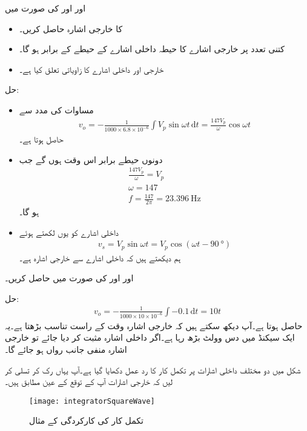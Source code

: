  اور  اور  کی صورت میں
\begin{itemize}
\item
   کا خارجی اشارہ حاصل کریں۔
\item
کتنی تعدد پر خارجی اشارے کا حیطہ داخلی اشارے کے حیطے  کے برابر ہو گا۔
\item
خارجی اور داخلی اشارے کا زاویاتی تعلق کیا ہے۔
\end{itemize}
حل:
\begin{itemize}
\item
مساوات  کی مدد سے
\begin{align*}
v_o=-\frac{1}{1000 \times 6.8 \times 10^{-6}} \int V_p \sin \omega t \, \mathrm{d} t=\frac{147 V_p}{\omega} \cos \omega t
\end{align*}
حاصل ہوتا ہے۔
\item
دونوں حیطے برابر اس وقت ہوں گے جب
\begin{align*}
\frac{147 V_p}{\omega}=V_p\\
\omega = 147\\
f=\frac{147}{2 \pi} =\SI{23.396}{\hertz}
\end{align*}
ہو گا۔
\item
داخلی اشارے کو یوں لکھتے ہوئے
\begin{align*}
v_s=V_p \sin \omega t= V_p \cos \left(\omega t-\SI{90}{\degree}\right)
\end{align*}
ہم دیکھتے ہیں کہ داخلی اشارے سے خارجی اشارہ   ہے۔
\end{itemize}
 اور  اور  کی صورت میں  حاصل کریں۔

حل:
\begin{align*}
v_o=-\frac{1}{1000 \times 10 \times 10^{-6}} \int -0.1 \, \mathrm{d}t =10 t
\end{align*}
حاصل ہوتا ہے۔آپ دیکھ سکتے ہیں کہ خارجی اشارہ وقت کے راست تناسب بڑھتا ہے۔یہ ایک سیکنڈ میں دس وولٹ بڑھ رہا ہے۔اگر داخلی اشارہ مثبت کر دیا جائے تو خارجی اشارہ منفی جانب رواں ہو جائے گا۔

شکل  میں دو مختلف داخلی اشارات پر تکمل کار کا رد عمل دکھایا گیا ہے۔آپ یہاں رک کر تسلی کر لیں کہ خارجی اشارات آپ کے توقع کے عین مطابق ہیں۔
\begin{figure}
\centering
\texttt{[image: integratorSquareWave]}
\caption{تکمل کار کی کارکردگی کے مثال}
\label{شکل_تکمل_کار_مثال}
\end{figure}

